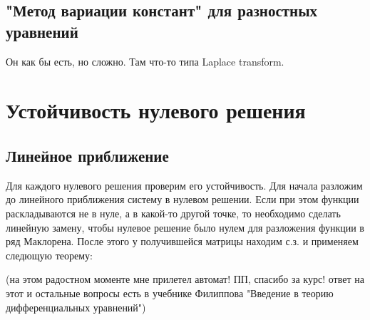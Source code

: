 \documentclass[11pt]{article}
\begin{document}
	\subsection{"Метод вариации констант" для разностных уравнений}
	
	Он как бы есть, но сложно. Там что-то типа Laplace transform.
	
	\section{Устойчивость нулевого решения}
	
	\subsection{Линейное приближение}
	
	Для каждого нулевого решения проверим его устойчивость. Для начала разложим до линейного приближения систему в нулевом решении. Если при этом функции раскладываются не в нуле, а в какой-то другой точке, то необходимо сделать линейную замену, чтобы нулевое решение было нулем для разложения функции в ряд Маклорена. После этого у получившейся матрицы находим с.з. и применяем следющую теорему: 
	
	(на этом радостном моменте мне прилетел автомат! ПП, спасибо за курс! ответ на этот и остальные вопросы есть в учебнике Филиппова "Введение в теорию дифференциальных уравнений")
\end{document}
